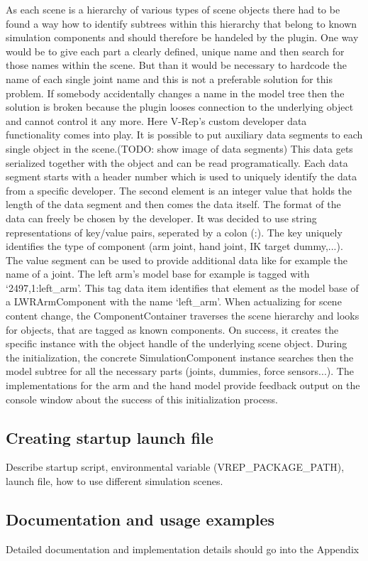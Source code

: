 As each scene is a hierarchy of various types of scene objects there had to be found a way how to identify subtrees within this hierarchy that belong to known simulation components and should therefore be handeled by the plugin. One way would be to give each part a clearly defined, unique name and then search for those names within the scene. But than it would be necessary to hardcode the name of each single joint name and this is not a preferable solution for this problem. If somebody accidentally changes a name in the model tree then the solution is broken because the plugin looses connection to the underlying object and cannot control it any more. Here V-Rep's custom developer data functionality comes into play. It is possible to put auxiliary data segments to each single object in the scene.(TODO: show image of data segments) This data gets serialized together with the object and can be read programatically. Each data segment starts with a header number which is used to uniquely identify the data from a specific developer. The second element is an integer value that holds the length of the data segment and then comes the data itself. The format of the data can freely be chosen by the developer. It was decided to use string representations of key/value pairs, seperated by a colon (:). The key uniquely identifies the type of component (arm joint, hand joint, IK target dummy,...). The value segment can be used to provide additional data like for example the name of a joint. The left arm's model base for example is tagged with `2497,1:left\_arm'. This tag data item identifies that element as the model base of a LWRArmComponent with the name `left\_arm'. When actualizing for scene content change, the ComponentContainer traverses the scene hierarchy and looks for objects, that are tagged as known components. On success, it creates the specific instance with the object handle of the underlying scene object. During the initialization, the concrete SimulationComponent instance searches then the model subtree for all the necessary parts (joints, dummies, force sensors...). The implementations for the arm and the hand model provide feedback output on the console window about the success of this initialization process.

\subsection{Creating startup launch file}

Describe startup script, environmental variable (VREP\_PACKAGE\_PATH), launch file, how to use different simulation scenes.

\subsection{Documentation and usage examples}
Detailed documentation and implementation details should go into the Appendix

